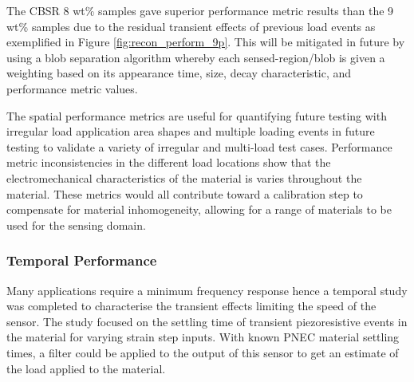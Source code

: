 The CBSR 8 wt\% samples gave superior performance metric results than the 9 wt\% samples due to the residual transient effects of previous load events as exemplified in Figure \ref{fig:recon_perform_9p}. This will be mitigated in future by using a blob separation algorithm whereby each sensed-region/blob is given a weighting based on its appearance time, size, decay characteristic, and performance metric values.

The spatial performance metrics are useful for quantifying future testing with irregular load application area shapes and multiple loading events in future testing to validate a variety of irregular and multi-load test cases. Performance metric inconsistencies in the different load locations show that the electromechanical characteristics of the material is varies throughout the material. These metrics would all contribute toward a calibration step to compensate for material inhomogeneity, allowing for a range of materials to be used for the sensing domain.


\subsubsection{Temporal Performance}\label{sec:Temporal Performance3}
Many applications require a minimum frequency response hence a temporal study was completed to characterise the transient effects limiting the speed of the sensor. The study focused on the settling time of transient piezoresistive events in the material for varying strain step inputs. With known PNEC material settling times, a filter could be applied to the output of this sensor to get an estimate of the load applied to the material. 

